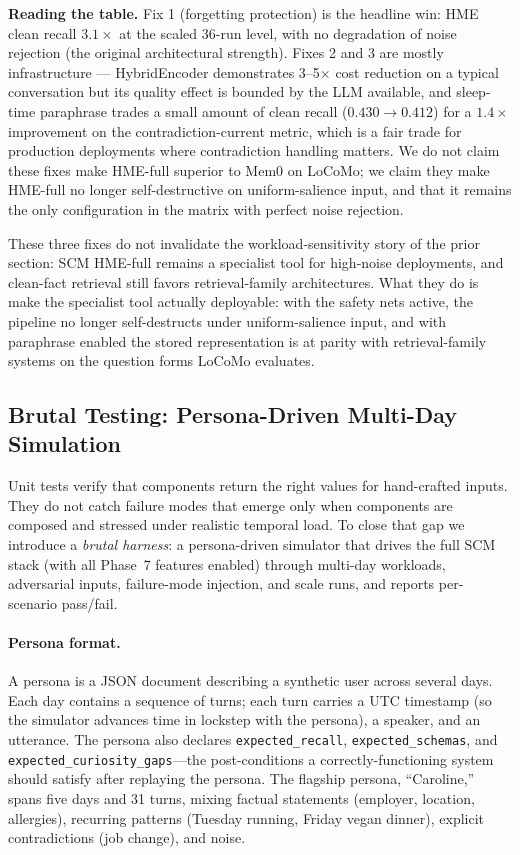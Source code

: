 \documentclass[11pt,twocolumn]{article}
\begin{document}
\textbf{Reading the table.} Fix 1 (forgetting protection) is the headline win: HME clean recall $3.1\times$ at the scaled 36-run level, with no degradation of noise rejection (the original architectural strength). Fixes 2 and 3 are mostly infrastructure --- HybridEncoder demonstrates 3--5$\times$ cost reduction on a typical conversation but its quality effect is bounded by the LLM available, and sleep-time paraphrase trades a small amount of clean recall ($0.430 \rightarrow 0.412$) for a $1.4\times$ improvement on the contradiction-current metric, which is a fair trade for production deployments where contradiction handling matters. We do not claim these fixes make HME-full superior to Mem0 on LoCoMo; we claim they make HME-full no longer self-destructive on uniform-salience input, and that it remains the only configuration in the matrix with perfect noise rejection.

These three fixes do not invalidate the workload-sensitivity story of the prior section: SCM HME-full remains a specialist tool for high-noise deployments, and clean-fact retrieval still favors retrieval-family architectures. What they do is make the specialist tool actually deployable: with the safety nets active, the pipeline no longer self-destructs under uniform-salience input, and with paraphrase enabled the stored representation is at parity with retrieval-family systems on the question forms LoCoMo evaluates.

\subsection{Brutal Testing: Persona-Driven Multi-Day Simulation}
\label{sec:brutal}

Unit tests verify that components return the right values for hand-crafted inputs. They do not catch failure modes that emerge only when components are composed and stressed under realistic temporal load. To close that gap we introduce a \emph{brutal harness}: a persona-driven simulator that drives the full SCM stack (with all Phase~7 features enabled) through multi-day workloads, adversarial inputs, failure-mode injection, and scale runs, and reports per-scenario pass/fail.

\paragraph{Persona format.} A persona is a JSON document describing a synthetic user across several days. Each day contains a sequence of turns; each turn carries a UTC timestamp (so the simulator advances time in lockstep with the persona), a speaker, and an utterance. The persona also declares \texttt{expected\_recall}, \texttt{expected\_schemas}, and \texttt{expected\_curiosity\_gaps}---the post-conditions a correctly-functioning system should satisfy after replaying the persona. The flagship persona, ``Caroline,'' spans five days and 31 turns, mixing factual statements (employer, location, allergies), recurring patterns (Tuesday running, Friday vegan dinner), explicit contradictions (job change), and noise.
\end{document}
